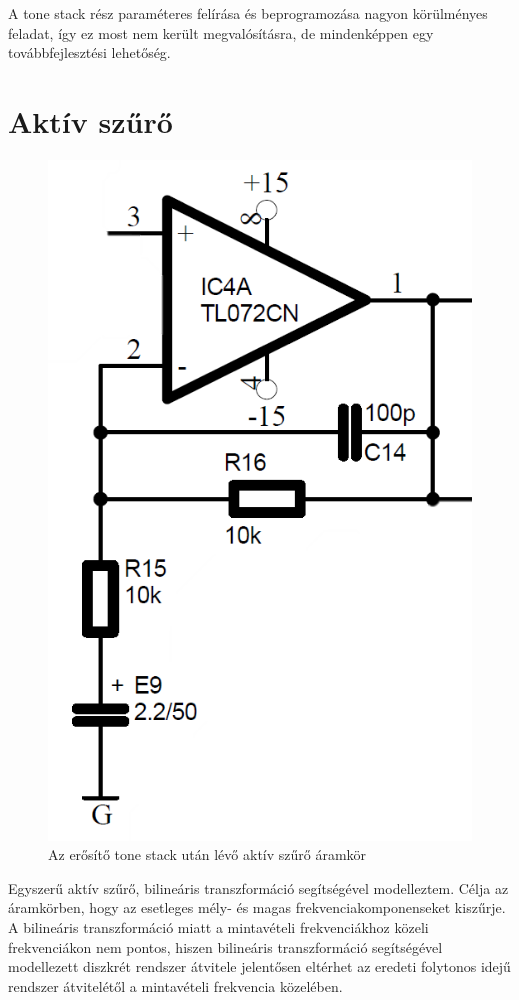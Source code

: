 A tone stack rész paraméteres felírása és beprogramozása nagyon körülményes feladat, így ez most nem került megvalósításra, de mindenképpen egy továbbfejlesztési lehetőség.
\section{Aktív szűrő}
\begin{figure}[H]
    \centering
    \includegraphics[scale=0.35]{figures/stage5.png}
    \caption{Az erősítő tone stack után lévő aktív szűrő áramkör}
\end{figure}
Egyszerű aktív szűrő, bilineáris transzformáció segítségével modelleztem. Célja az áramkörben, hogy az esetleges mély- és magas frekvenciakomponenseket kiszűrje. A bilineáris transzformáció miatt a mintavételi frekvenciákhoz közeli frekvenciákon nem pontos, hiszen bilineáris transzformáció segítségével modellezett diszkrét rendszer átvitele jelentősen eltérhet az eredeti folytonos idejű rendszer átvitelétől a mintavételi frekvencia közelében.
